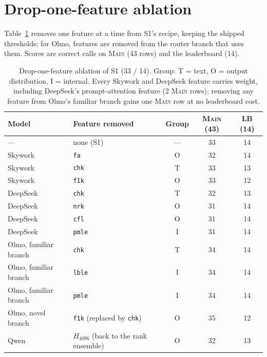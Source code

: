 \documentclass{article}
\newcommand{\sone}{\textsc{S1}}
\begin{document}
\section{Drop-one-feature ablation}
\label{app:dropone}
Table~\ref{tab:dropone} removes one feature at a time from \sone{}'s recipe, keeping the shipped thresholds; for Olmo, features are removed from the router branch that uses them. Scores are correct calls on \textsc{Main} (43 rows) and the leaderboard (14).
\begin{table}[h]
\centering\small
\caption{Drop-one-feature ablation of \sone{} (33 / 14). Group: T = text, O = output distribution, I = internal. Every Skywork and DeepSeek feature carries weight, including DeepSeek's prompt-attention feature (2 \textsc{Main} rows); removing any feature from Olmo's familiar branch gains one \textsc{Main} row at no leaderboard cost.}
\label{tab:dropone}
\begin{tabular}{llccc}
\toprule
Model & Feature removed & Group & \textsc{Main} (43) & LB (14) \\
\midrule
--- & none (\sone{}) & --- & 33 & 14 \\
\midrule
Skywork & \texttt{fa} & O & 32 & 14 \\
Skywork & \texttt{chk} & T & 33 & 13 \\
Skywork & \texttt{f1k} & O & 33 & 12 \\
\midrule
DeepSeek & \texttt{chk} & T & 32 & 13 \\
DeepSeek & \texttt{nrk} & O & 31 & 14 \\
DeepSeek & \texttt{cfl} & O & 31 & 14 \\
DeepSeek & \texttt{pmle} & I & 31 & 14 \\
\midrule
Olmo, familiar branch & \texttt{chk} & T & 34 & 14 \\
Olmo, familiar branch & \texttt{lble} & I & 34 & 14 \\
Olmo, familiar branch & \texttt{pmle} & I & 34 & 14 \\
Olmo, novel branch & \texttt{f1k} (replaced by \texttt{chk}) & O & 35 & 12 \\
\midrule
Qwen & $H_{4096}$ (back to the rank ensemble) & O & 32 & 13 \\
\bottomrule
\end{tabular}
\end{table}
\end{document}
